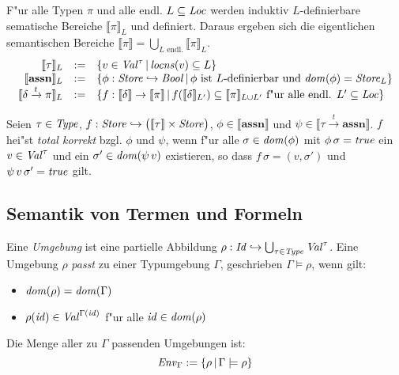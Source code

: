 \documentclass[12pt,a4paper,bigheadings]{scrartcl}
\newcommand{\semantic}[1]{\ensuremath{\llbracket#1\rrbracket}}
\newcommand{\assn}{\ensuremath{\mathbf{assn}}}
\newcommand{\locns}{\name{locns}}
\newcommand{\tto}{\ensuremath{\xrightarrow{t}}}
\begin{document}
F"ur alle Typen $\pi$ und alle endl. $L \subseteq {\text{\it Loc\/}}$ werden induktiv $L$-definierbare
sematische Bereiche $\semantic{\pi}_L$ und definiert. Daraus ergeben sich die eigentlichen
semantischen Bereiche $\semantic{\pi} = \bigcup\limits_{L \text{ endl.}} \semantic{\pi}_L$.
\[\begin{array}{rcl}
  \semantic{\tau}_L &:=& \{v \in \Val^\tau\,|\,\locns(v) \subseteq L\} \\
  \semantic{\assn}_L &:=& \{\phi:\Store\pto\Bool\,|\,\text{$\phi$ ist $L$-definierbar und $\dom{\phi}=\Store_L$}\} \\
  \semantic{\delta\tto\pi}_L &:=& \{f:\semantic{\delta}\to\semantic{\pi}\,|\,
                                    f(\semantic{\delta}_{L'}) \subseteq \semantic{\pi}_{L\cup L'}
                                    \text{ f"ur alle endl. $L'\subseteq\Loc$}\} 
\end{array}\]

\begin{definition}
  Seien $\tau\in{\text{\it Type\/}}$, $f:\Store \pto \bigl(\semantic{\tau} \times \Store\bigr)$,
  $\phi\in\semantic{\assn}$ und $\psi \in \semantic{\tau \tto \assn}$. $f$ hei"st
  {\em total korrekt} bzgl. $\phi$ und $\psi$, wenn f"ur alle $\sigma\in{\text{\it dom\/}}(\phi)$
  mit $\phi\,\sigma={\text{\it true\/}}$ ein $v\in{\text{\it Val\/}}^\tau$ und ein $\sigma'\in{\text{\it dom\/}}(\psi\,v)$
  existieren, so dass $f\,\sigma = (v,\sigma')$ und $\psi\,v\,\sigma'={\text{\it true\/}}$ gilt.
\end{definition}


\subsection{Semantik von Termen und Formeln}

Eine {\em Umgebung} ist eine partielle Abbildung $\rho:{\text{\it Id\/}}\hookrightarrow\bigcup_{\tau\in{\text{\it Type\/}}} {\text{\it Val\/}}^\tau$.
Eine Umgebung $\rho$ {\em passt} zu einer Typumgebung $\Gamma$, geschrieben $\Gamma \models \rho$,
wenn gilt:
\begin{itemize}
  \item ${\text{\it dom\/}}(\rho) = {\text{\it dom\/}}(\Gamma)$
  \item $\rho({\text{\it id\/}}) \in {\text{\it Val\/}}^{\Gamma({\text{\it id\/}})}$ f"ur alle ${\text{\it id\/}}\in{\text{\it dom\/}}(\rho)$
\end{itemize}
Die Menge aller zu $\Gamma$ passenden Umgebungen ist:
\[
  {\text{\it Env\/}}_\Gamma := \{\rho\,|\,\Gamma \models \rho\}
\]
\end{document}
